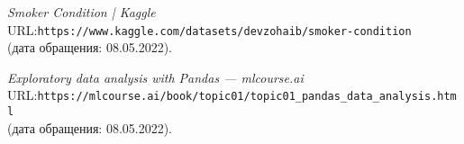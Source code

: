 \begin{thebibliography}{99}
{\itshape Smoker Condition | Kaggle}\\
URL:\texttt{https://www.kaggle.com/datasets/devzohaib/smoker-condition}\\
(дата обращения: 08.05.2022).

{\itshape Exploratory data analysis with Pandas --- mlcourse.ai}\\
URL:\texttt{https://mlcourse.ai/book/topic01/topic01\_pandas\_data\_analysis.html}\\
(дата обращения: 08.05.2022).

\end{thebibliography}
\pagebreak
